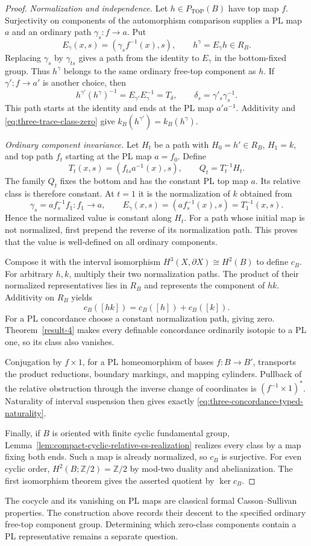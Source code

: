\begin{proof}
\emph{Normalization and independence.}
Let $h\in P_{\mathrm{TOP}}(B)$ have top map $f$.  Surjectivity
on components of the automorphism comparison supplies a
PL map $a$ and an ordinary path $\gamma_s:f\to a$.  Put
\begin{equation}\label{eq:three-endpoint-normalization}
 E_\gamma(x,s)=(\gamma_s f^{-1}(x),s),
 \qquad h^\gamma=E_\gamma h\in R_B.
\end{equation}
Replacing $\gamma_s$ by $\gamma_{ts}$ gives a path from the
identity to $E_\gamma$ in the bottom-fixed group.  Thus
$h^\gamma$ belongs to the same ordinary free-top component
as $h$.  If $\gamma':f\to a'$ is another choice, then
\[
 h^{\gamma'}(h^\gamma)^{-1}=E_{\gamma'}E_\gamma^{-1}
            =T_\delta,\qquad \delta_s=\gamma'_s\gamma_s^{-1}.
\]
This path starts at the identity and ends at the PL map
$a'a^{-1}$.  Additivity and \eqref{eq:three-trace-class-zero}
give $k_B(h^{\gamma'})=k_B(h^\gamma)$.

\emph{Ordinary component invariance.}
Let $H_t$ be a path with $H_0=h'\in R_B$, $H_1=k$, and
top path $f_t$ starting at the PL map $a=f_0$.  Define
\[
 T_t(x,s)=(f_{ts}a^{-1}(x),s),\qquad Q_t=T_t^{-1}H_t.
\]
The family $Q_t$ fixes the bottom and has the constant PL
top map $a$.  Its relative class is therefore constant.
At $t=1$ it is the normalization of $k$ obtained from
\[
 \gamma_s=a f_s^{-1}f_1:f_1\longrightarrow a,
 \qquad E_\gamma(x,s)=(a f_s^{-1}(x),s)=T_1^{-1}(x,s).
\]
Hence the normalized value is constant along $H_t$.  For a
path whose initial map is not normalized, first prepend
the reverse of its normalization path.  This proves that
the value is well-defined on all ordinary components.

Compose it with the interval isomorphism
$H^3(X,\partial X)\cong H^2(B)$ to define $c_B$.
For arbitrary $h,k$, multiply their two normalization
paths.  The product of their normalized representatives
lies in $R_B$ and represents the component of $hk$.
Additivity on $R_B$ yields
\[
 c_B([hk])=c_B([h])+c_B([k]).
\]
For a PL concordance choose a constant normalization path,
giving zero.  Theorem~\ref{result-4} makes every definable
concordance ordinarily isotopic to a PL one, so its class
also vanishes.

Conjugation by $f\times1$, for a PL homeomorphism of bases
$f:B\to B'$, transports the product reductions, boundary
markings, and mapping cylinders.  Pullback of the relative
obstruction through the inverse change of coordinates is
$(f^{-1}\times1)^*$.  Naturality of interval suspension
then gives exactly \eqref{eq:three-concordance-typed-naturality}.

Finally, if $B$ is oriented with finite cyclic fundamental
group, Lemma~\ref{lem:compact-cyclic-relative-cs-realization}
realizes every class by a map fixing both ends.  Such a map
is already normalized, so $c_B$ is surjective.  For even
cyclic order, $H^2(B;\mathbb Z/2)=\mathbb Z/2$ by mod-two
duality and abelianization.  The first isomorphism theorem
gives the asserted quotient by $\ker c_B$.
\end{proof}

The cocycle and its vanishing on PL maps are classical
formal Casson--Sullivan properties.  The construction above
records their descent to the specified ordinary free-top
component group. Determining which zero-class components contain
a PL representative remains a separate question.

